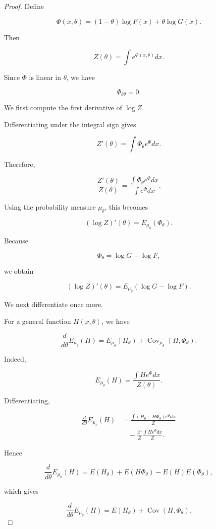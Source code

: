 \documentclass[10pt,a4paper]{amsart}
\begin{document}
\begin{proof}

Define

\[
\Phi(x,\theta)
=
(1-\theta)\log F(x)
+
\theta\log G(x).
\]

Then

\[
Z(\theta)
=
\int e^{\Phi(x,\theta)}dx .
\]

Since $\Phi$ is linear in $\theta$, we have

\[
\Phi_{\theta\theta}=0 .
\]


We first compute the first derivative of $\log Z$.

Differentiating under the integral sign gives

\[
Z'(\theta)
=
\int
\Phi_\theta e^\Phi dx .
\]

Therefore,

\[
\frac{Z'(\theta)}{Z(\theta)}
=
\frac{
\int
\Phi_\theta e^\Phi dx
}{
\int e^\Phi dx
}.
\]

Using the probability measure $\mu_\theta$, this becomes

\[
(\log Z)'(\theta)
=
E_{\mu_\theta}
(\Phi_\theta).
\]

Because

\[
\Phi_\theta
=
\log G-\log F ,
\]

we obtain

\[
(\log Z)'(\theta)
=
E_{\mu_\theta}
(
\log G-\log F
).
\]


We next differentiate once more.

For a general function $H(x,\theta)$, we have

\[
\frac d{d\theta}
E_{\mu_\theta}(H)
=
E_{\mu_\theta}(H_\theta)
+
\operatorname{Cov}_{\mu_\theta}
(H,\Phi_\theta).
\]

Indeed,

\[
E_{\mu_\theta}(H)
=
\frac{
\int H e^\Phi dx
}{
Z(\theta)
}.
\]

Differentiating,

\[
\begin{aligned}
\frac d{d\theta}E_{\mu_\theta}(H)
&=
\frac{
\int(H_\theta+H\Phi_\theta)e^\Phi dx
}{Z}
\\
&\quad
-
\frac{Z'}{Z}
\frac{\int He^\Phi dx}{Z}.
\end{aligned}
\]

Hence

\[
\frac d{d\theta}E_{\mu_\theta}(H)
=
E(H_\theta)
+
E(H\Phi_\theta)
-
E(H)E(\Phi_\theta),
\]

which gives

\[
\frac d{d\theta}E_{\mu_\theta}(H)
=
E(H_\theta)
+
\operatorname{Cov}(H,\Phi_\theta).
\]


\end{proof}
\end{document}
